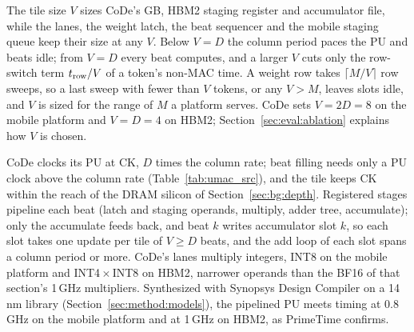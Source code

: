 The tile size $V$ sizes CoDe's GB, HBM2 staging register and accumulator file, while the lanes, the weight latch, the
beat sequencer and the mobile staging queue keep their size at any $V$. Below $V = D$ the column period paces the PU and beats idle; from
$V = D$ every beat computes, and a larger $V$ cuts only the row-switch term $\trow / V$ of a token's non-MAC time. A weight row takes $\lceil M/V \rceil$ row sweeps, so a last sweep with fewer than $V$
tokens, or any $V > M$, leaves slots idle, and $V$ is sized for the range of $M$ a platform serves. CoDe sets
$V = 2D = 8$ on the mobile platform and $V = D = 4$ on HBM2; Section~\ref{sec:eval:ablation} explains how $V$ is chosen.

CoDe clocks its PU at CK, $D$ times the column rate; beat filling needs only a PU clock above the column rate
(Table~\ref{tab:umac_src}), and the tile keeps CK within the reach of the DRAM silicon of Section~\ref{sec:bg:depth}. Registered stages pipeline each beat (latch and staging
operands, multiply, adder tree, accumulate); only the accumulate feeds back, and beat $k$ writes accumulator slot $k$, so each slot takes one update per tile of $V \ge D$ beats, and the add loop of each slot spans a column
period or more. CoDe's lanes multiply integers, INT8 on the mobile platform and INT4\,$\times$\,INT8 on HBM2,
narrower operands than the BF16 of that section's 1\,GHz multipliers.
Synthesized with Synopsys Design Compiler on a 14\,nm library (Section~\ref{sec:method:models}), the pipelined PU meets
timing at 0.8\,GHz on the mobile platform and at 1\,GHz on HBM2, as PrimeTime confirms.
